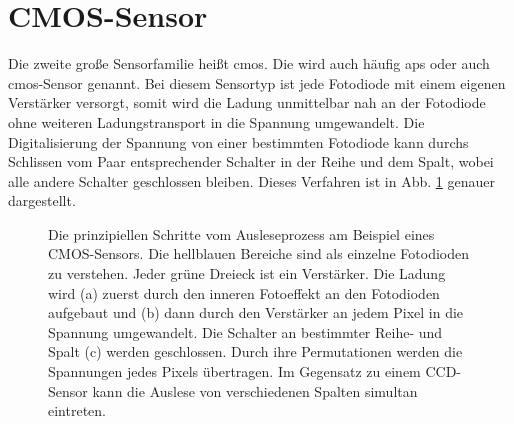 \section{CMOS-Sensor}
\label{text:cmos_theorie}
Die zweite große Sensorfamilie heißt \gls{cmos}. Die wird auch häufig \gls{aps} oder auch \gls{cmos}-Sensor genannt. Bei diesem Sensortyp ist jede Fotodiode mit einem eigenen Verstärker versorgt, somit wird die Ladung unmittelbar nah an der Fotodiode ohne weiteren Ladungstransport in die Spannung umgewandelt. Die Digitalisierung der Spannung von einer bestimmten Fotodiode kann durchs Schlissen vom Paar entsprechender Schalter in der Reihe und dem Spalt, wobei alle andere Schalter geschlossen bleiben. Dieses Verfahren ist in Abb. \ref{fig:cmos_scheme} genauer dargestellt.
\begin{figure}[H]
    \centering
    \hfill
    \hfill
    \caption{Die prinzipiellen Schritte vom Ausleseprozess am Beispiel eines  CMOS-Sensors. Die hellblauen Bereiche sind als einzelne Fotodioden zu verstehen. Jeder grüne Dreieck ist ein Verstärker. Die Ladung wird (a) zuerst durch den inneren Fotoeffekt an den Fotodioden aufgebaut und (b) dann durch den Verstärker an jedem Pixel in die Spannung umgewandelt. Die Schalter an bestimmter Reihe- und Spalt (c) werden geschlossen. Durch ihre Permutationen werden die Spannungen jedes Pixels übertragen. Im Gegensatz zu einem CCD-Sensor kann die Auslese von verschiedenen Spalten simultan eintreten.}
    \label{fig:cmos_scheme}
\end{figure}
